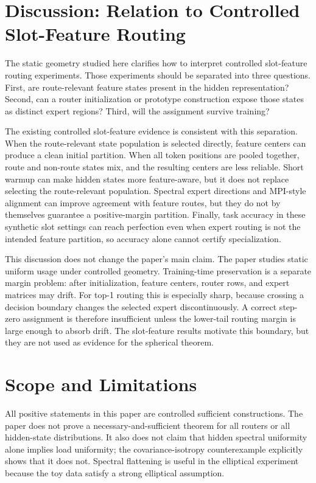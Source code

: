 \documentclass{article}
\begin{document}
\section{Discussion: Relation to Controlled Slot-Feature Routing}

The static geometry studied here clarifies how to interpret controlled
slot-feature routing experiments.  Those experiments should be separated into
three questions.  First, are route-relevant feature states present in the hidden
representation?  Second, can a router initialization or prototype construction
expose those states as distinct expert regions?  Third, will the assignment
survive training?

The existing controlled slot-feature evidence is consistent with this
separation.  When the route-relevant state population is selected directly,
feature centers can produce a clean initial partition.  When all token positions
are pooled together, route and non-route states mix, and the resulting centers
are less reliable.  Short warmup can make hidden states more feature-aware, but
it does not replace selecting the route-relevant population.  Spectral expert
directions and MPI-style alignment can improve agreement with feature routes,
but they do not by themselves guarantee a positive-margin partition.  Finally,
task accuracy in these synthetic slot settings can reach perfection even when
expert routing is not the intended feature partition, so accuracy alone cannot
certify specialization.

This discussion does not change the paper's main claim.  The paper studies
static uniform usage under controlled geometry.  Training-time preservation is a
separate margin problem: after initialization, feature centers, router rows, and
expert matrices may drift.  For top-1 routing this is especially sharp, because
crossing a decision boundary changes the selected expert discontinuously.  A
correct step-zero assignment is therefore insufficient unless the lower-tail
routing margin is large enough to absorb drift.  The slot-feature results
motivate this boundary, but they are not used as evidence for the spherical
theorem.

\section{Scope and Limitations}

All positive statements in this paper are controlled sufficient constructions.
The paper does not prove a necessary-and-sufficient theorem for all routers or
all hidden-state distributions.  It also does not claim that hidden spectral
uniformity alone implies load uniformity; the covariance-isotropy counterexample
explicitly shows that it does not.  Spectral flattening is useful in the
elliptical experiment because the toy data satisfy a strong elliptical
assumption.
\end{document}
